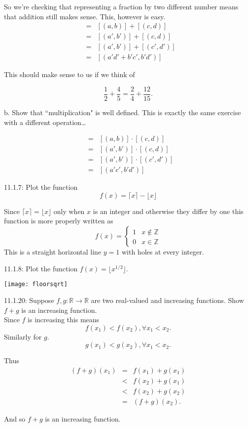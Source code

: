 \documentclass[16 pt]{amsart}
\theoremstyle{definition}
\theoremstyle{remark}
\numberwithin{equation}{subsection}
\newcommand{\R}{\mathbb{R}}
\newcommand{\Z}{\mathbb{Z}}
\begin{document}
So we're checking that representing a fraction by two different number means that addition still makes sense.  This, however is easy.
\begin{eqnarray*}
[(ad+bc,bd)] &=& [(a,b)]+[(c,d)]\\
& = & [(a',b')]+[(c,d)]\\
& = & [(a',b')]+[(c',d')]\\
&=& [(a'd'+b'c',b'd')]
\end{eqnarray*}


This should make sense to us if we think of

\[
\frac{1}{2} + \frac{4}{5} = \frac{2}{4} + \frac{12}{15}.
\]


b. Show that ``multiplication" is well defined.  This is exactly the same exercise with a different operation\dots

\begin{eqnarray*}
[(ac,bd)] &=& [(a,b)]\cdot[(c,d)]\\
& = & [(a',b')]\cdot[(c,d)]\\
& = & [(a',b')]\cdot[(c',d')]\\
&=& [(a'c',b'd')]
\end{eqnarray*}

\newpage

11.1.7: Plot the function
\[
f(x) = \lceil x \rceil - \lfloor x  \rfloor
\]

Since $\lceil x \rceil = \lfloor x\rfloor$ only when $x$ is an integer and otherwise they differ by one this function is more properly written as
\[
f(x) = \left\{ \begin{array}{cc} 1 & x\notin \Z \\ 0 & x\in\Z \end{array}\right.
\]
 This is a straight horizontal line $y=1$ with holes at every integer.

\newpage

11.1.8: Plot the function $f(x) = \lfloor x^{1/2} \rfloor$.

\vspace{1in}

\texttt{[image: floorsqrt]}

\newpage

11.1.20: Suppose $f,g:\R \rightarrow \R$ are two real-valued and increasing functions.  Show $f+g$ is an increasing function.\\

Since $f$ is increasing this means 
\[
f(x_1)<f(x_2), \forall x_1<x_2.  
\]
Similarly for $g$.
\[
g(x_1)<g(x_2), \forall x_1<x_2.  
\]

Thus
\begin{eqnarray*}
(f+g)(x_1) &=& f(x_1)+g(x_1)\\
           & < & f(x_2) + g(x_1)\\
           & < & f(x_2) + g(x_2)\\
           & = & (f+g)(x_2). 
\end{eqnarray*}


And so $f+g$ is an increasing function.
\end{document}

